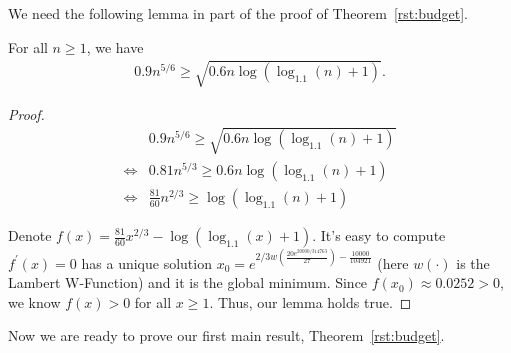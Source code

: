 We need the following lemma in part of the proof of Theorem~\ref{rst:budget}.
\begin{lemma}
For all $n\geq 1$, we have
\begin{align}
0.9n^{5/6} \geq \sqrt{0.6n \log(\log_{1.1}(n)+1)}. \nonumber
\end{align}
\label{lemma:cal2}
\end{lemma}
\begin{proof}
\begin{align}
&0.9n^{5/6} \geq \sqrt{0.6n \log(\log_{1.1}(n)+1)} \nonumber \\
\iff & 0.81 n^{5/3} \geq 0.6n \log(\log_{1.1}(n)+1) \nonumber \\
\iff &  \frac{81}{60} n^{2/3} \geq  \log(\log_{1.1}(n)+1) \nonumber
\end{align}

Denote $f(x) = \frac{81}{60}x^{2/3} - \log(\log_{1.1}(x)+1)$. It's easy to compute $f^{'}(x)=0$ has a unique solution $x_{0}=e^{2/3w(\frac{20e^{20000/314763}}{27})-\frac{10000}{104921}}$ (here $w(\cdot)$ is the Lambert W-Function) and it is the global minimum. Since $f(x_{0})\approx 0.0252 >0$, we know $f(x)>0$ for all $x\geq 1$. Thus, our lemma holds true.
\end{proof}


Now we are ready to prove our first main result, Theorem~\ref{rst:budget}.

